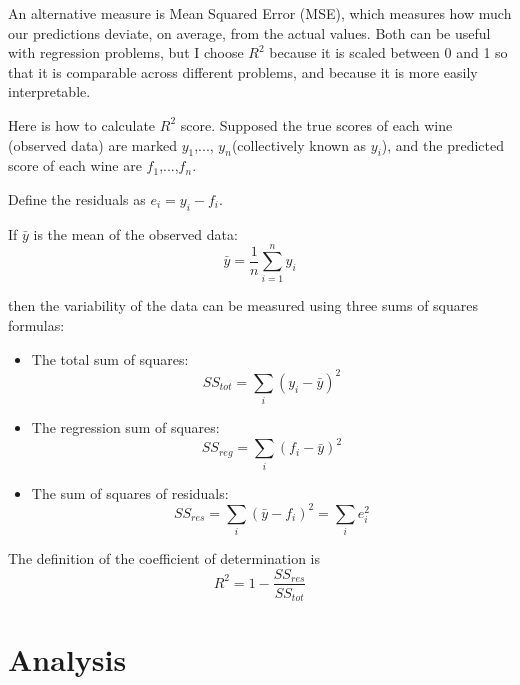 \documentclass{article}
\begin{document}
An alternative measure is Mean Squared Error (MSE), which measures how much our predictions deviate, on average, from the actual values. Both can be useful with regression problems, but I choose $R^2$ because it is scaled between 0 and 1 so that it is comparable across different problems, and because it is more easily interpretable.

Here is how to calculate $R^2$ score. Supposed the true scores of each wine (observed data) are marked $y_1$,..., $y_n$(collectively known as $y_i$), and the predicted score of each wine are $f_1$,...,$f_n$.

Define the residuals as $e_i = y_i - f_i$.

If $\bar{y}$ is the mean of the observed data:
$$ \bar{y} = \frac{1}{n} \sum_{i=1}^{n} y_i $$

then the variability of the data can be measured using three sums of squares formulas:
\begin{itemize}
  \item The total sum of squares:
  $$SS_{tot} = \sum\limits_{i}{(y_i - \bar{y})^2}$$
  \item The regression sum of squares:
  $$SS_{reg} = \sum\limits_{i}{(f_i - \bar{y})^2} $$
  \item The sum of squares of residuals:
  $$ SS_{res} = \sum\limits_{i}{(\bar{y} - f_i)^2} = \sum\limits_{i}{e_i^2} $$
\end{itemize}
 
The definition of the coefficient of determination is
$$ R^2 = 1 - \frac{SS_{res}}{SS_{tot}}$$

\section{Analysis}
\end{document}
